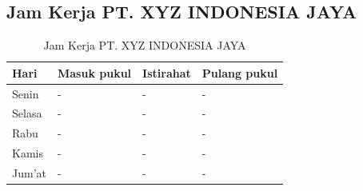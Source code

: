 \subsection{Jam Kerja PT. XYZ INDONESIA JAYA}
\begin{table}[ht!]
    \centering
    \begin{tabular}{|l|l|l|l|}
        \hline
        \textbf{Hari} & \textbf{Masuk pukul} & \textbf{Istirahat} & \textbf{Pulang pukul} \\ \hline
        Senin         & -                    & -                  & -                     \\ \hline
        Selasa        & -                    & -                  & -                     \\ \hline
        Rabu          & -                    & -                  & -                     \\ \hline
        Kamis         & -                    & -                  & -                     \\ \hline
        Jum'at        & -                    & -                  & -                     \\ \hline
    \end{tabular}
    \caption{Jam Kerja PT. XYZ INDONESIA JAYA}
    \label{tab:workingDays}
\end{table}